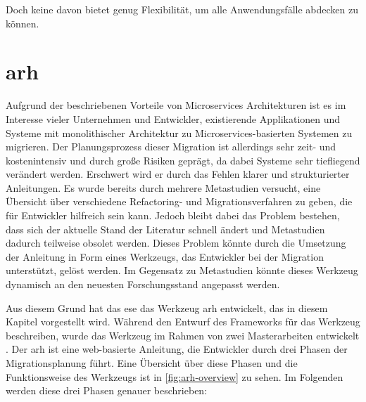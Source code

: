 Doch keine davon bietet genug Flexibilität, um alle Anwendungsfälle abdecken zu können. 

\section{\acrfull{arh}}

Aufgrund der beschriebenen Vorteile von Microservices Architekturen ist es im Interesse vieler Unternehmen und Entwickler, existierende Applikationen und Systeme mit monolithischer Architektur zu Microservices-basierten Systemen zu migrieren.
Der Planungsprozess dieser Migration ist allerdings sehr zeit- und kostenintensiv und durch große Risiken geprägt, da dabei Systeme sehr tiefliegend verändert werden.
Erschwert wird er durch das Fehlen klarer und strukturierter Anleitungen.
Es wurde bereits durch mehrere Metastudien versucht, eine Übersicht über verschiedene Refactoring- und Migrationsverfahren zu geben, die für Entwickler hilfreich sein kann.
Jedoch bleibt dabei das Problem bestehen, dass sich der aktuelle Stand der Literatur schnell ändert und Metastudien dadurch teilweise obsolet werden.
Dieses Problem könnte durch die Umsetzung der Anleitung in Form eines Werkzeugs, das Entwickler bei der Migration unterstützt, gelöst werden.
Im Gegensatz zu Metastudien könnte dieses Werkzeug dynamisch an den neuesten Forschungsstand angepasst werden.

Aus diesem Grund hat das \gls{ese} das Werkzeug \gls{arh} \cite{arh-github} entwickelt, das in diesem Kapitel vorgestellt wird.
Während  den Entwurf des Frameworks für das Werkzeug beschreiben, wurde das Werkzeug im Rahmen von zwei Masterarbeiten entwickelt \cite{master-daniel-koch}\cite{master-daniel-koch2}\cite{master-tobias-haller}.
Der \gls{arh} ist eine web-basierte Anleitung, die Entwickler durch drei Phasen der Migrationsplanung führt.
Eine Übersicht über diese Phasen und die Funktionsweise des Werkzeugs ist in \cref{fig:arh-overview} zu sehen.
Im Folgenden werden diese drei Phasen genauer beschrieben: 

